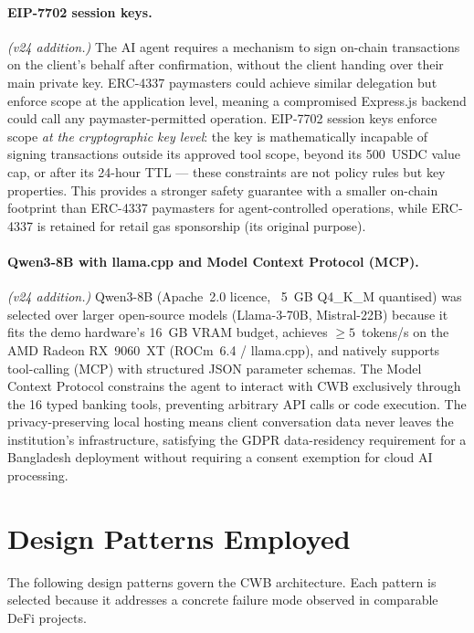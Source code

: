 \paragraph{EIP-7702 session keys.}
\emph{(v24 addition.)} The AI agent requires a mechanism to sign on-chain
transactions on the client's behalf after confirmation, without the client
handing over their main private key. ERC-4337 paymasters could achieve
similar delegation but enforce scope at the application level, meaning a
compromised Express.js backend could call any paymaster-permitted operation.
EIP-7702 session keys enforce scope \emph{at the cryptographic key level}:
the key is mathematically incapable of signing transactions outside its
approved tool scope, beyond its 500~USDC value cap, or after its 24-hour
TTL --- these constraints are not policy rules but key properties. This
provides a stronger safety guarantee with a smaller on-chain footprint than
ERC-4337 paymasters for agent-controlled operations, while ERC-4337 is
retained for retail gas sponsorship (its original purpose).

\paragraph{Qwen3-8B with llama.cpp and Model Context Protocol (MCP).}
\emph{(v24 addition.)} Qwen3-8B (Apache~2.0 licence, ~5~GB
Q4\_K\_M quantised) was selected over larger open-source models (Llama-3-70B,
Mistral-22B) because it fits the demo hardware's 16~GB VRAM budget, achieves
$\geq 5$~tokens/s on the AMD Radeon RX~9060~XT (ROCm~6.4 / llama.cpp), and
natively supports tool-calling (MCP) with structured JSON parameter
schemas. The Model Context Protocol constrains the agent to interact with
CWB exclusively through the 16 typed banking tools, preventing arbitrary API
calls or code execution. The privacy-preserving local hosting means client
conversation data never leaves the institution's infrastructure, satisfying
the GDPR data-residency requirement for a Bangladesh deployment without
requiring a consent exemption for cloud AI processing.

\section{Design Patterns Employed}
\label{sec:design-patterns}

The following design patterns govern the CWB architecture. Each pattern
is selected because it addresses a concrete failure mode observed in
comparable DeFi projects.

